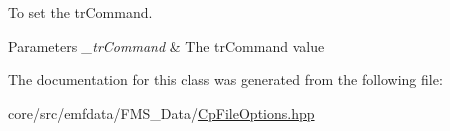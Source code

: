 To set the trCommand. 


\begin{DoxyParams}{Parameters}
{\em \_\-trCommand} & The trCommand value \\
\hline
\end{DoxyParams}


The documentation for this class was generated from the following file:\begin{DoxyCompactItemize}
\item 
core/src/emfdata/FMS\_\-Data/\hyperlink{CpFileOptions_8hpp}{CpFileOptions.hpp}\end{DoxyCompactItemize}
